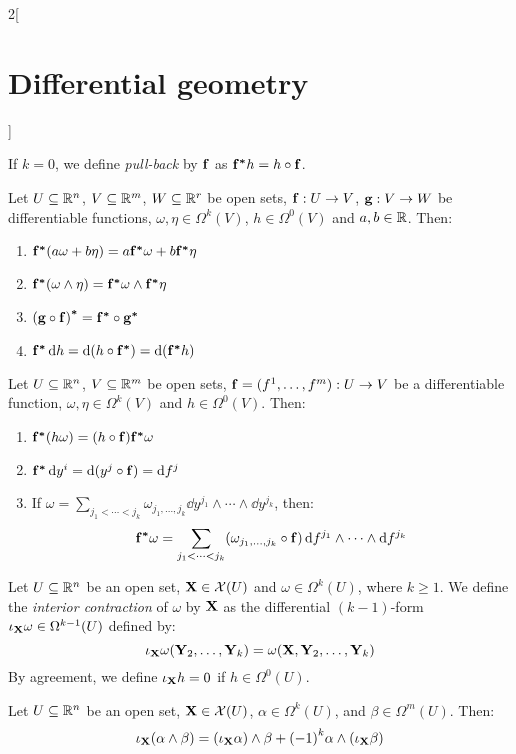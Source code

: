 \documentclass[../../../main.tex]{subfiles}
\begin{document}
\begin{multicols}{2}[\section{Differential geometry}]
\begin{definition}
    If $k=0$, we define \emph{pull-back} by $\boldsymbol{\mathrm{f}}$ as $\boldsymbol{\mathrm{f^*}}h=h\circ\boldsymbol{\mathrm{f}}$.
  \end{definition}
  \begin{proposition}
    Let $U\subseteq\mathbb{R}^n$, $V\subseteq\mathbb{R}^m$, $W\subseteq\mathbb{R}^r$ be open sets, $\boldsymbol{\mathrm{f}}:U\rightarrow V$, $\boldsymbol{\mathrm{g}}:V\rightarrow W$ be differentiable functions, $\omega,\eta\in\Omega^k(V)$, $h\in\Omega^0(V)$ and $a,b\in\mathbb{R}$. Then:
    \begin{enumerate}
      \item $\boldsymbol{\mathrm{f^*}}(a\omega+b\eta)=a\boldsymbol{\mathrm{f^*}}\omega+b\boldsymbol{\mathrm{f^*}}\eta$
      \item $\boldsymbol{\mathrm{f^*}}(\omega\wedge\eta)=\boldsymbol{\mathrm{f^*}}\omega\wedge \boldsymbol{\mathrm{f^*}}\eta$
      \item ${(\boldsymbol{\mathrm{g}}\circ \boldsymbol{\mathrm{f}})}^{\boldsymbol{\mathrm{*}}}=\boldsymbol{\mathrm{f^*}}\circ \boldsymbol{\mathrm{g^*}}$
      \item $\boldsymbol{\mathrm{f^*}}\dd{h}=\dd{(h\circ \boldsymbol{\mathrm{f^*}})}=\dd{(\boldsymbol{\mathrm{f^*}}h)}$
    \end{enumerate}
  \end{proposition}
  \begin{corollary}
    Let $U\subseteq\mathbb{R}^n$, $V\subseteq\mathbb{R}^m$ be open sets, $\boldsymbol{\mathrm{f}}=(f^1,\ldots,f^m):U\rightarrow V$ be a differentiable function, $\omega,\eta\in\Omega^k(V)$ and $h\in\Omega^0(V)$. Then:
    \begin{enumerate}
      \item $\boldsymbol{\mathrm{f^*}}(h\omega)=(h\circ \boldsymbol{\mathrm{f}})\boldsymbol{\mathrm{f^*}}\omega$
      \item $\boldsymbol{\mathrm{f^*}}\dd{y^i}=\dd{(y^j\circ \boldsymbol{\mathrm{f}})}=\dd{f^j}$
      \item If $\omega=\sum_{j_1<\cdots<j_k}\omega_{j_1,\ldots,j_k}\dd{y^{j_1}}\wedge\cdots\wedge\dd{y^{j_k}}$, then: $$\boldsymbol{\mathrm{f^*}}\omega=\sum_{j_1<\cdots<j_k}(\omega_{j_1,\ldots,j_k}\circ \boldsymbol{\mathrm{f}})\dd{f^{j_1}}\wedge\cdots\wedge\dd{f^{j_k}}$$
    \end{enumerate}
  \end{corollary}
  \begin{definition}
    Let $U\subseteq\mathbb{R}^n$ be an open set, $\boldsymbol{\mathrm{X}}\in\mathcal{X}(U)$ and $\omega\in\Omega^k(U)$, where $k\geq 1$.
    We define the \emph{interior contraction} of $\omega$ by $\boldsymbol{\mathrm{X}}$ as the differential $(k-1)$-form $\iota_{\boldsymbol{\mathrm{X}}}\omega\in\Omega^{k-1}(U)$ defined by:
    $$\iota_{\boldsymbol{\mathrm{X}}}\omega(\boldsymbol{\mathrm{Y}}_2,\ldots,\boldsymbol{\mathrm{Y}}_k)=\omega(\boldsymbol{\mathrm{X}},\boldsymbol{\mathrm{Y}}_2,\ldots,\boldsymbol{\mathrm{Y}}_k)$$
    By agreement, we define $\iota_{\boldsymbol{\mathrm{X}}}h=0$ if $h\in\Omega^0(U)$.
  \end{definition}
  \begin{proposition}
    Let $U\subseteq\mathbb{R}^n$ be an open set, $\boldsymbol{\mathrm{X}}\in\mathcal{X}(U)$, $\alpha\in\Omega^k(U)$, and $\beta\in\Omega^m(U)$. Then: $$\iota_{\boldsymbol{\mathrm{X}}}(\alpha\wedge\beta)=(\iota_{\boldsymbol{\mathrm{X}}}\alpha)\wedge\beta+{(-1)}^k\alpha\wedge(\iota_{\boldsymbol{\mathrm{X}}}\beta)$$

\end{proposition}
\end{multicols}
\end{document}
